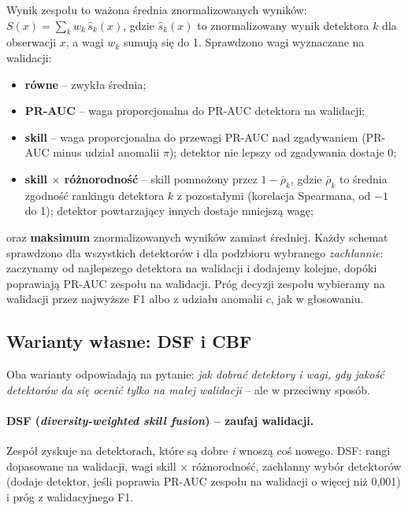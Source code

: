 \documentclass[11pt,a4paper]{article}
\begin{document}
Wynik zespołu to ważona średnia znormalizowanych wyników:
$S(x)=\sum_k w_k\,\hat s_k(x)$, gdzie $\hat s_k(x)$ to znormalizowany wynik
detektora $k$ dla obserwacji $x$, a wagi $w_k$ sumują się do 1. Sprawdzono
wagi wyznaczane na walidacji:
\begin{itemize}
  \item \textbf{równe} -- zwykła średnia;
  \item \textbf{PR-AUC} -- waga proporcjonalna do PR-AUC detektora na walidacji;
  \item \textbf{skill} -- waga proporcjonalna do przewagi PR-AUC nad
  zgadywaniem (PR-AUC minus udział anomalii $\pi$); detektor nie lepszy od
  zgadywania dostaje 0;
  \item \textbf{skill $\times$ różnorodność} -- skill pomnożony przez
  $1-\bar\rho_k$, gdzie $\bar\rho_k$ to średnia zgodność rankingu detektora
  $k$ z pozostałymi (korelacja Spearmana, od $-1$ do 1); detektor
  powtarzający innych dostaje mniejszą wagę;
\end{itemize}
oraz \textbf{maksimum} znormalizowanych wyników zamiast średniej. Każdy
schemat sprawdzono dla wszystkich detektorów i dla podzbioru wybranego
\emph{zachłannie}: zaczynamy od najlepszego detektora na walidacji
i dodajemy kolejne, dopóki poprawiają PR-AUC zespołu na walidacji. Próg
decyzji zespołu wybieramy na walidacji przez najwyższe F1 albo z udziału
anomalii $c$, jak w głosowaniu.

\FloatBarrier
\subsection{Warianty własne: DSF i CBF}
\label{sec:own}

Oba warianty odpowiadają na pytanie: \emph{jak dobrać detektory i wagi,
gdy jakość detektorów da się ocenić tylko na małej walidacji} -- ale
w przeciwny sposób.

\paragraph{DSF (\emph{diversity-weighted skill fusion}) -- zaufaj
walidacji.} Zespół zyskuje na detektorach, które są dobre \emph{i} wnoszą
coś nowego. DSF: rangi dopasowane na walidacji, wagi skill $\times$
różnorodność, zachłanny wybór detektorów (dodaje detektor, jeśli poprawia
PR-AUC zespołu na walidacji o więcej niż 0,001) i próg z walidacyjnego F1.
\end{document}
